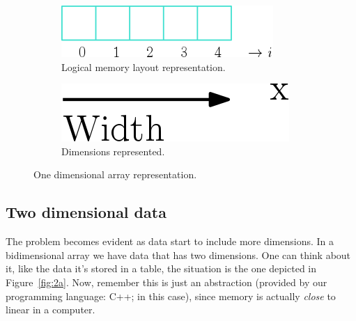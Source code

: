 \begin{figure}[htp]
  \centering
  \begin{subfigure}[b]{0.35\textwidth}
    \includegraphics[width=\textwidth]{img/array1D}
    \caption{Logical memory layout representation.}
  \label{fig:1a}
  \end{subfigure}
  \hspace*{4cm}
  \begin{subfigure}[b]{0.25\textwidth}
    \includegraphics[width=\textwidth]{img/arrow1D}
    \caption{Dimensions represented.}
    \label{fig:1b}
  \end{subfigure}
  \caption{One dimensional array representation.}
  \label{fig:1D}
\end{figure}

\subsection{Two dimensional data}

The problem becomes evident as data start to include more dimensions.
In a bidimensional array we have data that has two dimensions.
One can think about it, like the data it's stored in a table, the situation is the one depicted in Figure~\ref{fig:2a}.
Now, remember this is just an abstraction (provided by our programming language: C++; in this case), since memory is actually \emph{close} to linear in a computer.

